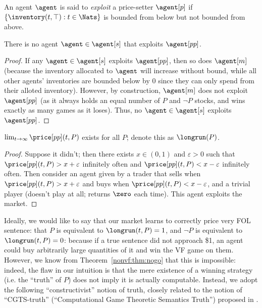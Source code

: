\begin{definition}[Exploitation]
    An agent $\agent$ is said to \emph{exploit} a price-setter $\agent[p]$ if $\{\inventory(t,\top):t\in\Nats\}$ is bounded from below but not bounded from above.
    \label{nonvf:def:exploit}
\end{definition}

\begin{lemma}[Inexploitabity]
    There is no agent $\agent\in\agent[s]$ that exploits $\agent[pp]$.
    \label{nonvf:lem:inexploit}
\end{lemma}
\begin{proof}
    If any $\agent\in\agent[s]$ exploits $\agent[pp]$, then so does $\agent[m]$ (because the inventory allocated to $\agent$ will increase without bound, while all other agents' inventories are bounded below by 0 since they can only spend from their alloted inventory). However, by construction, $\agent[m]$ does not exploit $\agent[pp]$ (as it always holds an equal number of $P$ and $\lnot P$ stocks, and wins exactly as many games as it loses). Thus, no $\agent\in\agent[s]$ exploits $\agent[pp]$.
\end{proof}

\begin{theorem}[Convergence]
    $\lim_{t\to\infty}\price[pp](t,P)$ exists for all $P$; denote this as $\longrun(P)$.
    \label{nonvf:thm:convergence}
\end{theorem}
\begin{proof}
    Suppose it didn't; then there exists $x\in(0,1)$ and $\varepsilon>0$ such that $\price[pp](t,P)>x+\varepsilon$ infinitely often and $\price[pp](t,P)<x-\varepsilon$ infinitely often. Then consider an agent given by a trader that sells when $\price[pp](t,P)>x+\varepsilon$ and buys when $\price[pp](t,P)<x-\varepsilon$, and a trivial player (doesn't play at all; returns $\zero$ each time). This agent exploits the market.
\end{proof}

Ideally, we would like to say that our market learns to correctly price very FOL sentence: that $P$ is equivalent to $\longrun(t,P)=1$, and $\lnot P$ is equivalent to $\longrun(t,P)=0$: because if a true sentence did not approach \$1, an agent could buy arbitrarily large quantities of it and win the VF game on them. However, we know from Theorem~\ref{nonvf:thm:nogo} that this is impossible: indeed, the flaw in our intuition is that the mere existence of a winning strategy (i.e. the ``truth'' of $P$) does not imply it is actually computable. Instead, we adopt the following ``constructivist'' notion of truth, closely related to the notion of ``CGTS-truth'' (``Computational Game Theoretic Semantics Truth'') proposed in \citet{boyerProofTruth2012b}.

